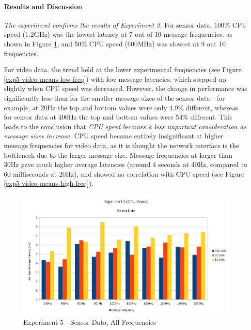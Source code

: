 \documentclass[../dissertation.tex]{subfiles}
\begin{document}
\paragraph{Results and Discussion} \textit{The experiment confirms the results of Experiment 3.} For sensor data, 100\% CPU speed (1.2GHz) was the lowest latency at 7 out of 10 message frequencies, as shown in Figure \ref{exp5-sensor-means-all-freq}, and 50\% CPU speed (600MHz) was slowest at 9 out 10 frequencies.

For video data, the trend held at the lower experimental frequencies (see Figure \ref{exp5-video-means-low-freq}) with low message latencies, which stepped up slightly when CPU speed was decreased. However, the change in performance was significantly less than for the smaller message sizes of the sensor data - for example, at 20Hz the top and bottom values were only 4.9\% different, whereas for sensor data at 400Hz the top and bottom values were 54\% different. This leads to the conclusion that \textit{CPU speed becomes a less important consideration as message sizes increase.} CPU speed became entirely insignificant at higher message frequencies for video data, as it is thought the network interface is the bottleneck due to the larger message size. Message frequencies at larger than 30Hz gave much higher average latencies (around 4 seconds at 40Hz, compared to 60 milliseconds at 20Hz), and showed no correlation with CPU speed (see Figure \ref{exp5-video-means-high-freq}).

\begin{figure}[H]
\centering
\includegraphics[width=\textwidth]{images/experiment5/sensor_data_all_freqs.png}
\caption{Experiment 5 - Sensor Data, All Frequencies}
\label{exp5-sensor-means-all-freq}
\end{figure}
\end{document}
